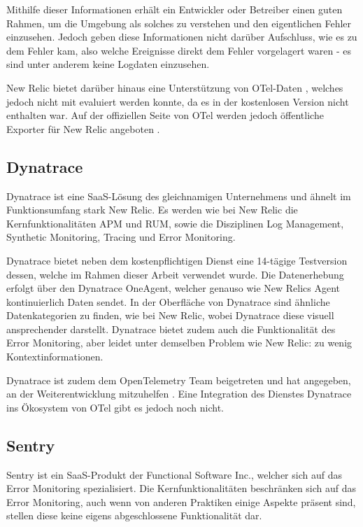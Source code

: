 Mithilfe dieser Informationen erhält ein Entwickler oder Betreiber einen guten Rahmen, um die Umgebung als solches zu verstehen und den eigentlichen Fehler einzusehen. Jedoch geben diese Informationen nicht darüber Aufschluss, wie es zu dem Fehler kam, also welche Ereignisse direkt dem Fehler vorgelagert waren - es sind unter anderem keine Logdaten einzusehen.

New Relic bietet darüber hinaus eine Unterstützung von OTel-Daten  \cite{NewRelicAnnoundOTelBetaSupport}, welches jedoch nicht mit evaluiert werden konnte, da es in der kostenlosen Version nicht enthalten war. Auf der offiziellen Seite von OTel werden jedoch  öffentliche Exporter für New Relic angeboten \cite{OpenTelemetryRegistry}.

\subsection{Dynatrace}

Dynatrace \cite{Dynatrace} ist eine SaaS-Lösung des gleichnamigen Unternehmens und ähnelt im Funktionsumfang stark New Relic. Es werden wie bei New Relic die Kernfunktionalitäten APM und RUM, sowie die Disziplinen Log Management, Synthetic Monitoring, Tracing und Error Monitoring.

Dynatrace bietet neben dem kostenpflichtigen Dienst eine 14-tägige Testversion dessen, welche im Rahmen dieser Arbeit verwendet wurde. Die Datenerhebung erfolgt über den Dynatrace OneAgent, welcher genauso wie New Relics Agent kontinuierlich Daten sendet. In der Oberfläche von Dynatrace sind ähnliche Datenkategorien zu finden, wie bei New Relic, wobei Dynatrace diese visuell ansprechender darstellt. Dynatrace bietet zudem auch die Funktionalität des Error Monitoring, aber leidet unter demselben Problem wie New Relic: zu wenig Kontextinformationen.

Dynatrace ist zudem dem OpenTelemetry Team beigetreten und hat angegeben, an der Weiterentwicklung mitzuhelfen \cite{DynatraceJoinOTelProject}. Eine Integration des Dienstes Dynatrace ins Ökosystem von OTel gibt es jedoch noch nicht.

\subsection{Sentry}

Sentry \cite{Sentry} ist ein SaaS-Produkt der Functional Software Inc., welcher sich auf das Error Monitoring spezialisiert. Die Kernfunktionalitäten beschränken sich auf das Error Monitoring, auch wenn von anderen Praktiken einige Aspekte präsent sind, stellen diese keine eigens abgeschlossene Funktionalität dar.

